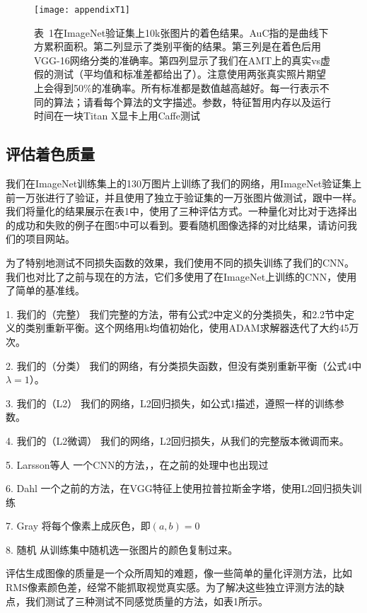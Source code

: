 \begin{figure}[h]
  \centering
  \texttt{[image: appendixT1]}
  \caption*{表~1\quad 在ImageNet验证集上10k张图片的着色结果。AuC指的是曲线下方累积面积。第二列显示了类别平衡的结果。第三列是在着色后用VGG-16网络分类的准确率。第四列显示了我们在AMT上的真实vs虚假的测试（平均值和标准差都给出了）。注意使用两张真实照片期望上会得到50\%的准确率。所有标准都是数值越高越好。每一行表示不同的算法；请看每个算法的文字描述。参数，特征暂用内存以及运行时间在一块Titan X显卡上用Caffe测试}
  \label{tab:badfigure6}
\end{figure}

\subsection{评估着色质量}

我们在ImageNet训练集上的130万图片上训练了我们的网络，用ImageNet验证集上前一万张进行了验证，并且使用了独立于验证集的一万张图片做测试，跟中一样。我们将量化的结果展示在表1中，使用了三种评估方式。一种量化对比对于选择出的成功和失败的例子在图5中可以看到。要看随机图像选择的对比结果，请访问我们的项目网站。


为了特别地测试不同损失函数的效果，我们使用不同的损失训练了我们的CNN。我们也对比了之前与现在的方法，它们多使用了在ImageNet上训练的CNN，使用了简单的基准线。

1. {\heiti 我们的（完整）} 我们完整的方法，带有公式2中定义的分类损失，和2.2节中定义的类别重新平衡。这个网络用k均值初始化，使用ADAM求解器迭代了大约45万次。

2. {\heiti 我们的（分类）} 我们的网络，有分类损失函数，但没有类别重新平衡（公式4中$\lambda = 1$）。

3. {\heiti 我们的（L2）} 我们的网络，L2回归损失，如公式1描述，遵照一样的训练参数。

4. {\heiti 我们的（L2微调）} 我们的网络，L2回归损失，从我们的完整版本微调而来。

5. {\heiti Larsson等人} 一个CNN的方法，，在之前的处理中也出现过

6. {\heiti Dahl} 一个之前的方法，在VGG特征上使用拉普拉斯金字塔，使用L2回归损失训练

7. {\heiti Gray} 将每个像素上成灰色，即$(a,b)=0$

8. {\heiti 随机} 从训练集中随机选一张图片的颜色复制过来。

评估生成图像的质量是一个众所周知的难题，像一些简单的量化评测方法，比如RMS像素颜色差，经常不能抓取视觉真实感。为了解决这些独立评测方法的缺点，我们测试了三种测试不同感觉质量的方法，如表1所示。

